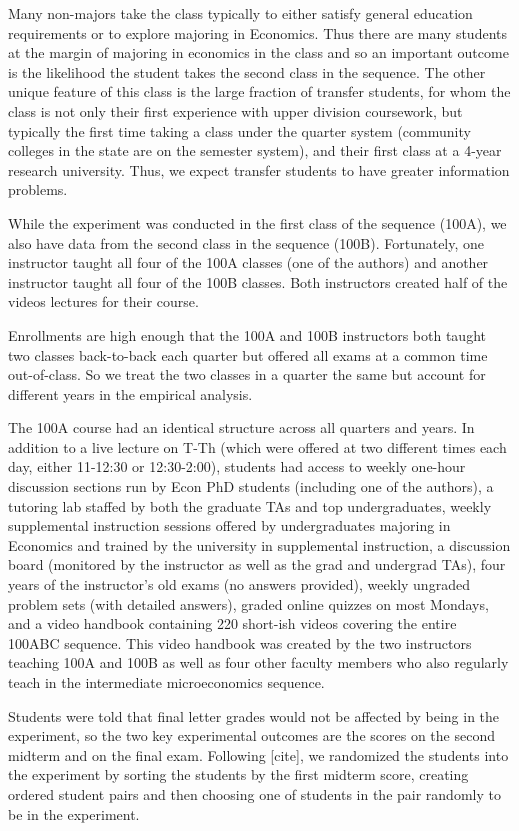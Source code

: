 \documentclass[12pt]{article}
\begin{document}
Many non-majors take the class typically to either satisfy general education requirements or to explore majoring in Economics. Thus there are many students at the margin of majoring in economics in the class and so an important outcome is the likelihood the student takes the second class in the sequence. The other unique feature of this class is the large fraction of transfer students, for whom the class is not only their first experience with upper division coursework, but typically the first time taking a class under the quarter system (community colleges in the state are on the semester system), and their first class at a 4-year research university. Thus, we expect transfer students to have greater information problems.

While the experiment was conducted in the first class of the sequence (100A), we also have data from the second class in the sequence (100B). Fortunately, one instructor taught all four of the 100A classes (one of the authors) and another instructor taught all four of the 100B classes. Both instructors created half of the videos lectures for their course.

Enrollments are high enough that the 100A and 100B instructors both taught two classes back-to-back each quarter but offered all exams at a common time out-of-class. So we treat the two classes in a quarter the same but account for different years in the empirical analysis.

The 100A course had an identical structure across all quarters and years. In addition to a live lecture on T-Th (which were offered at two different times each day, either 11-12:30 or 12:30-2:00), students had access to weekly one-hour discussion sections run by Econ PhD students (including one of the authors), a tutoring lab staffed by both the graduate TAs and top undergraduates, weekly supplemental instruction sessions offered by undergraduates majoring in Economics and trained by the university in supplemental instruction, a discussion board (monitored by the instructor as well as the grad and undergrad TAs), four years of the instructor's old exams (no answers provided), weekly ungraded problem sets (with detailed answers), graded online quizzes on most Mondays, and a video handbook containing 220 short-ish videos covering the entire 100ABC sequence. This video handbook was created by the two instructors teaching 100A and 100B as well as four other faculty members who also regularly teach in the intermediate microeconomics sequence.

Students were told that final letter grades would not be affected by being in the experiment, so the two key experimental outcomes are the scores on the second midterm and on the final exam. Following [cite], we randomized the students into the experiment by sorting the students by the first midterm score, creating ordered student pairs and then choosing one of students in the pair randomly to be in the experiment.
\end{document}
